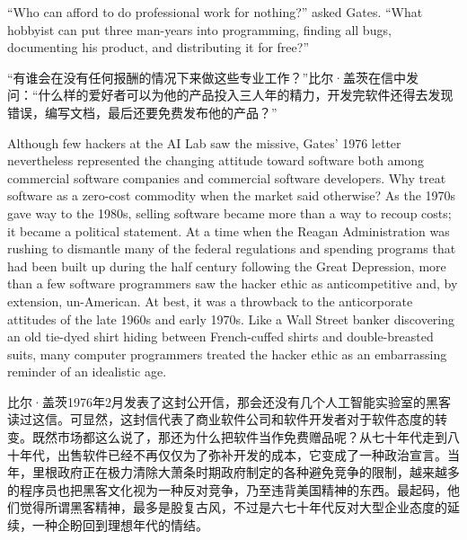 \ifdefined\eng
``Who can afford to do professional work for nothing?'' asked Gates. ``What hobbyist can put three man-years into programming, finding all bugs, documenting his product, and distributing it for free?''
\fi

\ifdefined\chs
``有谁会在没有任何报酬的情况下来做这些专业工作？''比尔·盖茨在信中发问：``什么样的爱好者可以为他的产品投入三人年的精力，开发完软件还得去发现错误，编写文档，最后还要免费发布他的产品？''
\fi

\ifdefined\eng
Although few hackers at the AI Lab saw the missive, Gates' 1976 letter nevertheless represented the changing attitude toward software both among commercial software companies and commercial software developers. Why treat software as a zero-cost commodity when the market said otherwise? As the 1970s gave way to the 1980s, selling software became more than a way to recoup costs; it became a political statement. At a time when the Reagan Administration was rushing to dismantle many of the federal regulations and spending programs that had been built up during the half century following the Great Depression, more than a few software programmers saw the hacker ethic as anticompetitive and, by extension, un-American. At best, it was a throwback to the anticorporate attitudes of the late 1960s and early 1970s. Like a Wall Street banker discovering an old tie-dyed shirt hiding between French-cuffed shirts and double-breasted suits, many computer programmers treated the hacker ethic as an embarrassing reminder of an idealistic age.
\fi

\ifdefined\chs
比尔·盖茨1976年2月发表了这封公开信，那会还没有几个人工智能实验室的黑客读过这信。可显然，这封信代表了商业软件公司和软件开发者对于软件态度的转变。既然市场都这么说了，那还为什么把软件当作免费赠品呢？从七十年代走到八十年代，出售软件已经不再仅仅为了弥补开发的成本，它变成了一种政治宣言。当年，里根政府正在极力清除大萧条时期政府制定的各种避免竞争的限制，越来越多的程序员也把黑客文化视为一种反对竞争，乃至违背美国精神的东西。最起码，他们觉得所谓黑客精神，最多是股复古风，不过是六七十年代反对大型企业态度的延续，一种企盼回到理想年代的情结。
\fi

